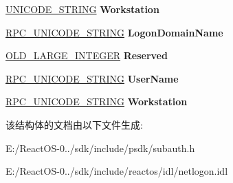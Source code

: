 \begin{DoxyCompactItemize}
\hyperlink{struct___u_n_i_c_o_d_e___s_t_r_i_n_g}{U\+N\+I\+C\+O\+D\+E\+\_\+\+S\+T\+R\+I\+NG} {\bfseries Workstation}
\item 
\mbox{\label{struct___n_e_t_l_o_g_o_n___l_o_g_o_n___i_d_e_n_t_i_t_y___i_n_f_o_a34b907dd9e3056ee572758a7e153f1dc}} 
\hyperlink{struct___r_p_c___u_n_i_c_o_d_e___s_t_r_i_n_g}{R\+P\+C\+\_\+\+U\+N\+I\+C\+O\+D\+E\+\_\+\+S\+T\+R\+I\+NG} {\bfseries Logon\+Domain\+Name}
\item 
\mbox{\label{struct___n_e_t_l_o_g_o_n___l_o_g_o_n___i_d_e_n_t_i_t_y___i_n_f_o_a4e02d2464763da72c241e5b3b9e1f29d}} 
\hyperlink{struct___o_l_d___l_a_r_g_e___i_n_t_e_g_e_r}{O\+L\+D\+\_\+\+L\+A\+R\+G\+E\+\_\+\+I\+N\+T\+E\+G\+ER} {\bfseries Reserved}
\item 
\mbox{\label{struct___n_e_t_l_o_g_o_n___l_o_g_o_n___i_d_e_n_t_i_t_y___i_n_f_o_a77b43528a10963a35f2dc7cfc05ec537}} 
\hyperlink{struct___r_p_c___u_n_i_c_o_d_e___s_t_r_i_n_g}{R\+P\+C\+\_\+\+U\+N\+I\+C\+O\+D\+E\+\_\+\+S\+T\+R\+I\+NG} {\bfseries User\+Name}
\item 
\mbox{\label{struct___n_e_t_l_o_g_o_n___l_o_g_o_n___i_d_e_n_t_i_t_y___i_n_f_o_a3a6d642da2e0dd0522a8f2ec8cf4a3ba}} 
\hyperlink{struct___r_p_c___u_n_i_c_o_d_e___s_t_r_i_n_g}{R\+P\+C\+\_\+\+U\+N\+I\+C\+O\+D\+E\+\_\+\+S\+T\+R\+I\+NG} {\bfseries Workstation}
\end{DoxyCompactItemize}


该结构体的文档由以下文件生成\+:\begin{DoxyCompactItemize}
\item 
E\+:/\+React\+O\+S-\/0../sdk/include/psdk/subauth.\+h\item 
E\+:/\+React\+O\+S-\/0../sdk/include/reactos/idl/netlogon.\+idl\end{DoxyCompactItemize}
